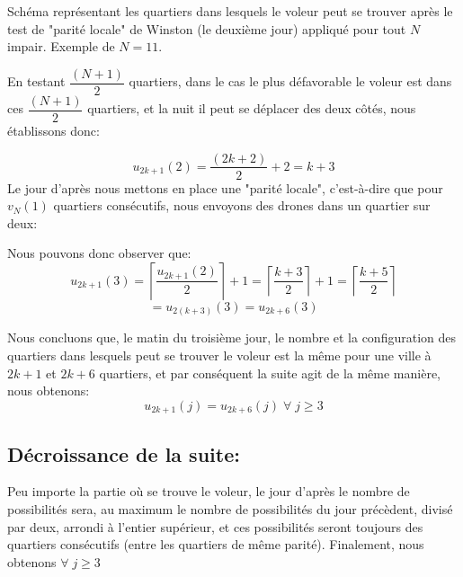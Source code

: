 \begin{figureleg}
\begin{center}
Schéma représentant les quartiers dans lesquels le voleur peut se trouver après le test de "parité locale" de Winston (le deuxième jour) appliqué pour tout $N$ impair. Exemple de $N=11$.
\end{center}
\end{figureleg}

En testant $\dfrac{(N+1)}{2}$ quartiers, dans le cas le plus défavorable le voleur est dans ces $\dfrac{(N+1)}{2}$ quartiers, et la nuit il peut se déplacer des deux côtés, nous établissons donc:

$$u_{2k+1}(2)=\dfrac{(2k+2)}{2}+2=k+3$$
Le jour d'après nous mettons en place une "parité locale", c'est-à-dire que pour $v_N(1)$ quartiers consécutifs, nous envoyons des drones dans un quartier sur deux:

Nous pouvons donc observer que:
$$u_{2k+1}(3)=\left\lceil{\dfrac{u_{2k+1}(2)}{2}}\right\rceil+1=\left\lceil{\dfrac{k+3}{2}}\right\rceil+1=\left\lceil{\dfrac{k+5}{2}}\right\rceil$$
$$=u_{2(k+3)}(3)=u_{2k+6}(3)$$

Nous concluons que, le matin du troisième jour, le nombre et la configuration des quartiers dans lesquels peut se trouver le voleur est la même pour une ville à $2k+1$ et $2k+6$ quartiers, et par conséquent la suite agit de la même manière, nous obtenons: $$u_{2k+1}(j)=u_{2k+6}(j) \; \forall \; j\geq 3$$

\subsection{Décroissance de la suite:}
Peu importe la partie où se trouve le voleur, le jour d'après le nombre de possibilités sera, au maximum le nombre de possibilités du jour précèdent, divisé par deux, arrondi à l'entier supérieur, et ces possibilités seront toujours des quartiers consécutifs (entre les quartiers de même parité). Finalement, nous obtenons $\forall \; j\geq 3$ 

